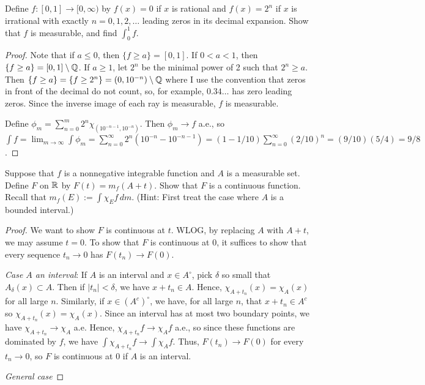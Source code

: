 \documentclass{article}
\newcommand{\dm}{\,dm}
\begin{document}
 Define $f: [0,1] \to [0, \infty)$ by $f(x) = 0$ if $x$ is rational and $f(x) = 2^n$ if $x$ is irrational with exactly $n = 0,1,2,\ldots$ leading zeros in its decimal expansion. Show that $f$ is measurable, and find $\int_0^1 f$.
\begin{proof}
Note that if $a \le 0$, then $\{f \ge a\} = [0,1]$. If $0 < a < 1$, then $\{f \ge a\} = [0,1]\setminus \mathbb{Q}$.
If $a\ge 1$, let $2^n$ be the minimal power of 2 such that $2^n \ge a$. Then $\{f \ge a\} = \{f \ge 2^n\} = (0, 10^{-n}) \setminus \mathbb{Q}$ where I use the convention that zeros in front of the decimal do not count, so, for example, $0.34\ldots$ has zero leading zeros. Since the inverse image of each ray is measurable, $f$ is measurable.

Define $\phi_m = \sum_{n=0}^m 2^n \chi_{(10^{-n-1}, 10^{-n})}$. Then $\phi_m \to f$ a.e., so $\int f = \lim_{m\to\infty} \int \phi_m = \sum_{n=0}^\infty 2^n (10^{-n} - 10^{-n-1})
 = (1 - 1/10) \sum_{n=0}^\infty (2/10)^n = (9/10)(5/4) = 9/8$.

\end{proof}
 Suppose that $f$ is a nonnegative integrable function and $A$ is a measurable set. Define $F$ on $\mathbb{R}$ by $F(t) = m_f(A+t)$. Show that $F$ is a continuous function. Recall that $m_f(E) := \int \chi_E f \dm$. (Hint: First treat the case where $A$ is a bounded interval.)
\begin{proof}
We want to show $F$ is continuous at $t$.  WLOG, by replacing $A$ with $A+t$, we may assume $t=0$. To show that $F$ is continuous at $0$, it suffices to show that every sequence $t_n \to 0$ has $F(t_n) \to F(0)$.  

\emph{Case $A$ an interval}: If $A$ is an interval and $x \in A^\circ$, pick $\delta$ so small that $A_{\delta}(x) \subset A$. Then if $|t_n| < \delta$, we have $x+t_n \in A$. Hence, $\chi_{A+t_n}(x) = \chi_{A}(x)$ for all large $n$.  Similarly, if $x \in (A^c)^\circ$, we have, for all large $n$, that $x+t_n \in A^c$ so $\chi_{A+t_n}(x) = \chi_{A}(x)$.  Since an interval has at most two boundary points, we have $\chi_{A+t_n} \to \chi_{A}$ a.e.  Hence, $\chi_{A+t_n} f \to \chi_{A} f$ a.e., so since these functions are dominated by $f$, we have $\int \chi_{A+t_n} f \to \int \chi_{A} f$. Thus, $F(t_n) \to F(0)$ for every $t_n \to 0$, so $F$ is continuous at $0$ if $A$ is an interval.

\emph{General case}

\end{proof}
\end{document}
